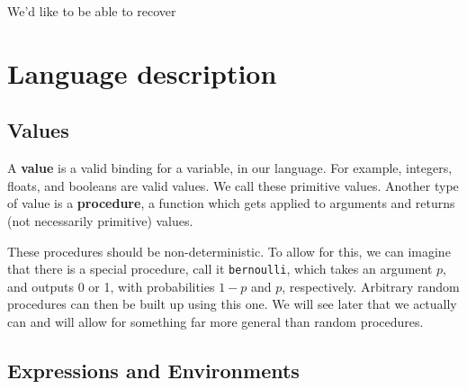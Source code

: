 \documentclass[11pt]{article}
\begin{document}
We'd like to be able to recover 










\section{Language description}

\subsection{Values}

A {\bf value} is a valid binding for a variable, in our language.  For example, integers, floats, and booleans are valid values.  We call these primitive values.  Another type of value is a {\bf procedure}, a function which gets applied to arguments and returns (not necessarily primitive) values.  

These procedures should be non-deterministic.  To allow for this, we can imagine that there is a special procedure, call it {\tt bernoulli}, which takes an argument $p$, and outputs 0 or 1, with probabilities $1-p$ and $p$, respectively.  Arbitrary random procedures can then be built up using this one.   We will see later that we actually can and will allow for something far more general than random procedures.



\subsection{Expressions and Environments}
\end{document}

